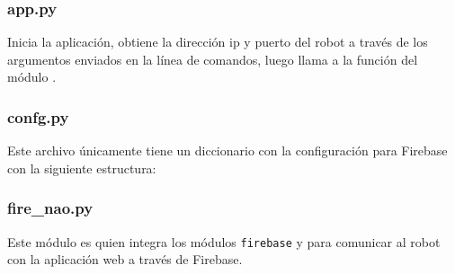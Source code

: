 \subsubsection{app.py}
\label{\detokenize{nao_firebase:app-py}}\label{\detokenize{nao_firebase:module-app}}

\begin{fulllineitems}
\label{\detokenize{nao_firebase:app.main}}
Inicia la aplicación, obtiene la dirección ip y puerto del robot a través
de los argumentos enviados en la línea de comandos, luego llama a la función
 del módulo .

\end{fulllineitems}



\subsubsection{confg.py}
\label{\detokenize{nao_firebase:confg-py}}
Este archivo únicamente tiene un diccionario con la configuración para Firebase
con la siguiente estructura:

%
\begin{sphinxVerbatim}[commandchars=\\\{\}]
  
     
     
     
\end{sphinxVerbatim}


\subsubsection{fire\_nao.py}
\label{\detokenize{nao_firebase:fire-nao-py}}
Este módulo es quien integra los módulos \texttt{firebase} y  para comunicar al robot
con la aplicación web a través de Firebase.
